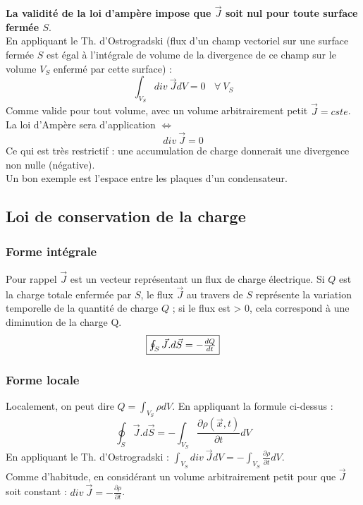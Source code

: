 \documentclass	[11pt, a4paper, openany]{book}
\begin{document}
\textbf{La validité de la loi d'ampère impose que $\vec{J}$ soit nul pour toute surface fermée $S$}.\\
En appliquant le Th. d'Ostrogradski (flux d'un champ vectoriel sur une surface fermée $S$ est égal à l'intégrale de volume de la divergence de ce champ sur le volume $V_S$ enfermé par cette surface) :
\begin{equation}
\int_{V_S} div\ \vec{J} dV = 0\ \ \ \ \forall\ V_S
\end{equation}
Comme valide pour tout volume, avec un volume arbitrairement petit $\vec{J} = cste$. La loi d'Ampère sera d'application $\Leftrightarrow$
\begin{equation}
div\ \vec{J} = 0
\end{equation}
Ce qui est très restrictif : une accumulation de charge donnerait une divergence non nulle (négative).\\
Un bon exemple est l'espace entre les plaques d'un condensateur.

\subsection{Loi de conservation de la charge}
\subsubsection{Forme intégrale}
Pour rappel $\vec{J}$ est un vecteur représentant un flux de charge électrique. Si $Q$ est la charge totale enfermée par $S$, le flux $\vec{J}$ au travers de $S$ représente la variation temporelle de la quantité de charge $Q$ ; si le flux est > 0, cela correspond à une diminution de la charge Q.
\begin{equation}
\fbox{$ \oint_S \vec{J}.d\vec{S} = - \frac{dQ}{dt}$}
\end{equation}

\subsubsection{Forme locale}
Localement, on peut dire $Q = \int_{V_S} \rho dV$. En appliquant la formule ci-dessus :
\begin{equation}
\oint_S \vec{J}.d\vec{S} = - \int_{V_S} \frac{\partial\rho(\vec{x}, t)}{\partial t}dV
\end{equation}
En appliquant le Th. d'Ostrogradski : 
$\int_{V_S} div\ \vec{J}dV = -\int_{V_S} \frac{\partial\rho}{\partial t}dV$.\\
Comme d'habitude, en considérant un volume arbitrairement petit pour que $\vec{J}$ soit constant : $div\ \vec{J} = -\frac{\partial \rho}{\partial t}$.\\
\end{document}
